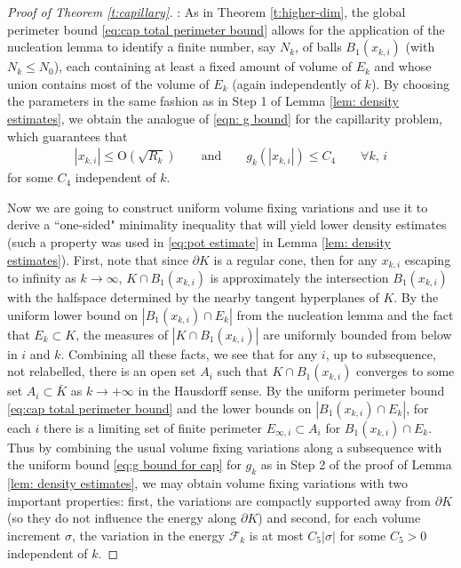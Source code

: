 \documentclass[10pt,reqno]{amsart}
\numberwithin{equation}{section}
\theoremstyle{definition}
\begin{document}
{{\begin{proof}[Proof of Theorem \ref{t:capillary}]
: As in Theorem \ref{t:higher-dim}, the global perimeter bound \eqref{eq:cap total perimeter bound} allows for the application of the nucleation lemma \cite[Lemma 29.10]{Mag12} to identify a finite number, say $N_k$, of balls $B_1(x_{k,i})$ (with $N_k \leq N_0$), each containing at least a fixed amount of volume of $E_k$ and whose union contains most of the volume of $E_k$ (again independently of $k$). By choosing the parameters in the same fashion as in Step 1 of Lemma \ref{lem: density estimates}, we obtain the analogue of \eqref{eqn: g bound} for the capillarity problem, which guarantees that 
\begin{align}\label{eq:g bound for cap}
 |x_{k,i}|\leq \mathrm{O}(\sqrt{R_k})\qquad \mbox{and}\qquad   g_{k}(|x_{k,i}|) \leq C_4 \qquad \forall k,\,i
\end{align}
for some $C_4$ independent of $k$. 

Now we are going to construct uniform volume fixing variations and use it to derive a ``one-sided" minimality inequality that will yield lower density estimates (such a property was used in \eqref{eq:pot estimate} in Lemma \ref{lem: density estimates}). First, note that since $\partial K$ is a regular cone, then for any $x_{k,i}$ escaping to infinity as $k\to \infty$, $K \cap B_1(x_{k,i})$ is approximately the intersection $B_1(x_{k,i})$ with the halfspace determined by the nearby tangent hyperplanes of $K$. By the uniform lower bound on $|B_1(x_{k,i})\cap E_k|$ from the nucleation lemma and the fact that $E_k\subset K$, the measures of $|K \cap B_1(x_{k,i})|$ are uniformly bounded from below in $i$ and $k$. Combining all these facts, we see that for any $i$, up to subsequence, not relabelled, there is an open set $A_i$ such that $K \cap B_1(x_{k,i})$ converges to some set $A_i \subset \bar{K}$ as $k\to+\infty$ in the Hausdorff sense. By the uniform perimeter bound \eqref{eq:cap total perimeter bound} and the lower bounds on $|B_1(x_{k,i}) \cap E_k|$, for each $i$ there is a limiting set of finite perimeter $E_{\infty,i}\subset A_i$ for $B_1(x_{k,i}) \cap E_k$. Thus by combining the usual volume fixing variations along a subsequence with the uniform bound \eqref{eq:g bound for cap} for $g_{k}$ as in Step 2 of the proof of Lemma \ref{lem: density estimates}, we may obtain volume fixing variations with two important properties: first, the variations are compactly supported away from $\partial K$ (so they do not influence the energy along $\partial K$) and second, for each volume increment $\sigma$, the variation in the energy $\mathcal{F}_k$ is at most $C_5|\sigma|$ for some $C_5>0$ independent of $k$. 


\end{proof}}}
\end{document}
